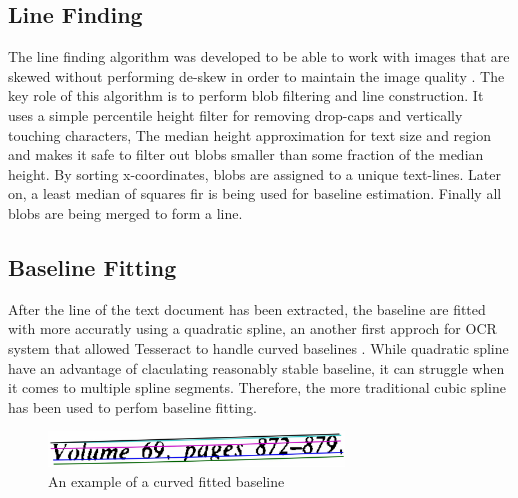 \subsection{Line Finding}

The line finding algorithm was developed to be able to work with images that are skewed without performing de-skew in order to maintain  the image quality \cite{Line_Finding_Algorithem}. The key role of this algorithm is to perform blob filtering and line construction. It uses a simple percentile height filter for removing drop-caps and vertically touching characters, The median height approximation for text size and region and makes it safe to filter out blobs smaller than some fraction of the median height. By sorting x-coordinates, blobs are assigned to a unique text-lines. Later on, a least median of squares fir \cite{least_median_squares_algorithm} is being used for baseline estimation. Finally all blobs are being merged to form a line.

\subsection{Baseline Fitting}

After the line of the text document has been extracted, the baseline are fitted with more accuratly using a quadratic spline, an another first approch for OCR system that allowed Tesseract to handle curved baselines \cite{quadratic_spline_algorithm}. While quadratic spline have an advantage of claculating reasonably stable baseline, it can struggle when it comes to multiple spline segments. Therefore, the more traditional cubic spline \cite{Traditional_cubic_algorithm} has been used to perfom baseline fitting.

\begin{figure}[!ht]
    \centering
    \includegraphics[width=0.7\textwidth]{chapters/images/OCR/Base_Line_Fitting.JPG}
    \caption{An example of a curved fitted baseline \cite{AnOverviewoftheTesseractOCREngine}}
    \label{fig:Baseline_Fitting}
\end{figure}


